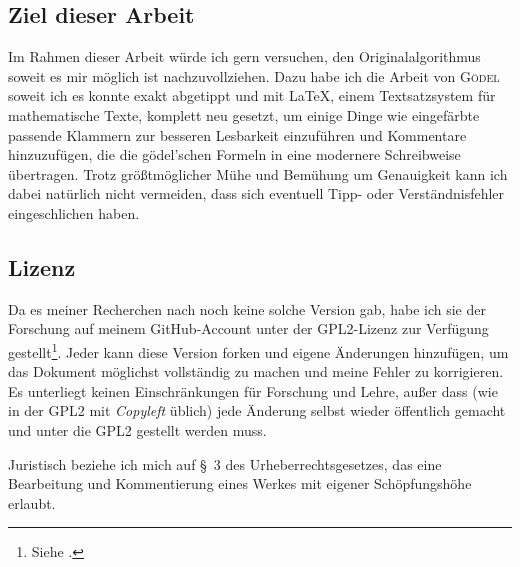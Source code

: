 \subsection*{Ziel dieser Arbeit}

Im Rahmen dieser Arbeit würde ich gern versuchen, den Originalalgorithmus soweit
es mir möglich ist nachzuvollziehen. Dazu habe ich die Arbeit von \textsc{Gödel} soweit ich
es konnte exakt abgetippt und mit \LaTeX, einem Textsatzsystem für mathematische
Texte, komplett neu gesetzt, um einige Dinge wie eingefärbte passende Klammern zur besseren
Lesbarkeit einzuführen und Kommentare hinzuzufügen, die die gödel'schen Formeln in eine modernere
Schreibweise übertragen. Trotz größtmöglicher Mühe und Bemühung um Genauigkeit
kann ich dabei natürlich nicht vermeiden, dass sich eventuell Tipp- oder Verständnisfehler
eingeschlichen haben.

\subsection*{Lizenz}

Da es meiner Recherchen nach noch keine solche Version gab, habe ich sie der
Forschung auf meinem GitHub-Account unter der GPL2-Lizenz zur Verfügung
gestellt\footnote{Siehe .}.
Jeder kann diese Version forken und eigene Änderungen hinzufügen, um das
Dokument möglichst vollständig zu machen und meine Fehler zu korrigieren.
Es unterliegt keinen Einschränkungen für Forschung und Lehre, außer dass
(wie in der GPL2 mit \textit{Copyleft} üblich) jede Änderung selbst wieder
öffentlich gemacht und unter die GPL2 gestellt werden muss.

Juristisch beziehe ich mich auf §~3 des Urheberrechtsgesetzes, das eine
Bearbeitung und Kommentierung eines Werkes mit eigener Schöpfungshöhe
erlaubt.

\newpage

\printbibliography[keyword={own}]

\newpage
{}
\setcounter{footnote}{0}
\setcounter{page}{173}
\let\thefootnote\originalthefootnote
